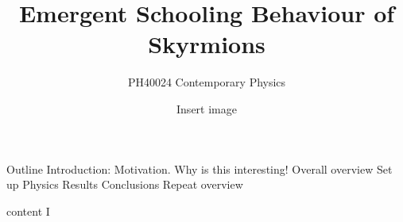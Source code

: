\documentclass[t, 11pt, xcolor=dvipsnames]{beamer}
\subtitle{PH40024 Contemporary Physics}
\title{Emergent Schooling Behaviour of Skyrmions}
\author{ Insert image } %
\date{}
\begin{document}
\begin{frame}[plain]
  \maketitle
{}
\end{frame}
\addtocounter{framenumber}{-1} %

\begin{frame}[plain]{Outline}
  Introduction:
        Motivation. Why is this interesting!
        Overall overview
        Set up
        Physics
  Results
  Conclusions
        Repeat overview
  \hypertarget<1>{slide1}{}
\end{frame}

\begin{frame}[plain]{content I}
  \hypertarget<1>{slide2}{}
\end{frame}
\end{document}
